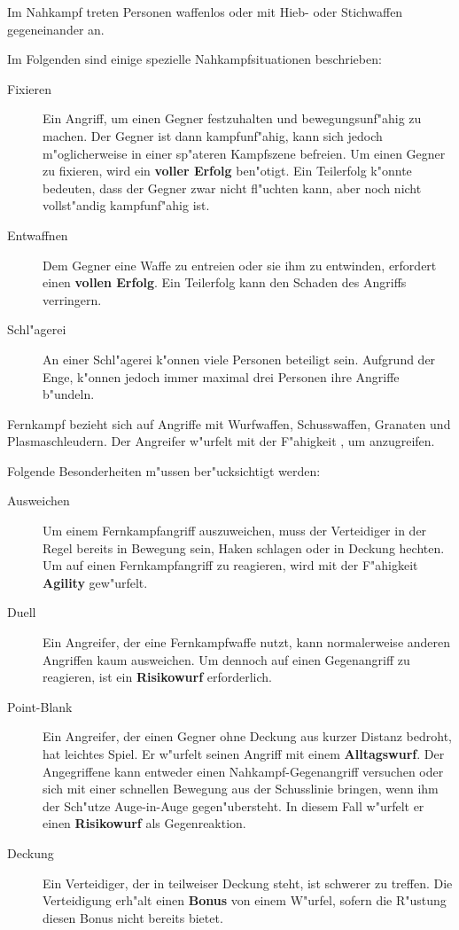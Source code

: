 Im Nahkampf treten Personen waffenlos oder mit Hieb- oder Stichwaffen gegeneinander an.

Im Folgenden sind einige spezielle Nahkampfsituationen beschrieben:

\begin{description}
    \item[Fixieren] Ein Angriff, um einen Gegner festzuhalten und bewegungsunf"ahig zu machen. Der Gegner ist dann kampfunf"ahig, kann sich 
        jedoch m"oglicherweise in einer sp"ateren Kampfszene befreien. Um einen Gegner zu fixieren, wird ein \textbf{voller Erfolg} ben"otigt. Ein Teilerfolg k"onnte bedeuten, dass der Gegner zwar nicht fl"uchten kann, aber noch nicht vollst"andig kampfunf"ahig ist.
    \item[Entwaffnen] Dem Gegner eine Waffe zu entrei\3en oder sie ihm zu entwinden, erfordert einen \textbf{vollen Erfolg}. Ein Teilerfolg 
        kann den Schaden des Angriffs verringern.
    \item[Schl"agerei] An einer Schl"agerei k"onnen viele Personen beteiligt sein. Aufgrund der Enge, k"onnen jedoch immer maximal drei 
        Personen ihre Angriffe b"undeln.
\end{description}

Fernkampf bezieht sich auf Angriffe mit Wurfwaffen, Schusswaffen, Granaten und Plasmaschleudern. Der Angreifer w"urfelt mit der F"ahigkeit , um anzugreifen.

Folgende Besonderheiten m"ussen ber"ucksichtigt werden:

\begin{description}
    \item[Ausweichen] Um einem Fernkampfangriff auszuweichen, muss der Verteidiger in der Regel bereits in Bewegung sein, Haken schlagen 
        oder in Deckung hechten. Um auf einen Fernkampfangriff zu reagieren, wird mit der F"ahigkeit \textbf{Agility} gew"urfelt.
    \item[Duell] Ein Angreifer, der eine Fernkampfwaffe nutzt, kann normalerweise anderen Angriffen kaum ausweichen. Um dennoch auf 
        einen Gegenangriff zu reagieren, ist ein \textbf{Risikowurf} erforderlich.
    \item[Point-Blank] Ein Angreifer, der einen Gegner ohne Deckung aus kurzer Distanz bedroht, hat leichtes Spiel. Er w"urfelt seinen 
        Angriff mit einem \textbf{Alltagswurf}. Der Angegriffene kann entweder einen Nahkampf-Gegenangriff versuchen oder sich mit einer schnellen Bewegung aus der Schusslinie bringen, wenn ihm der Sch"utze Auge-in-Auge gegen"ubersteht. In diesem Fall w"urfelt er einen \textbf{Risikowurf} als Gegenreaktion.
    \item[Deckung] Ein Verteidiger, der in teilweiser Deckung steht, ist schwerer zu treffen. Die Verteidigung erh"alt einen \textbf{Bonus}  
        von einem W"urfel, sofern die R"ustung diesen Bonus nicht bereits bietet.
\end{description}

